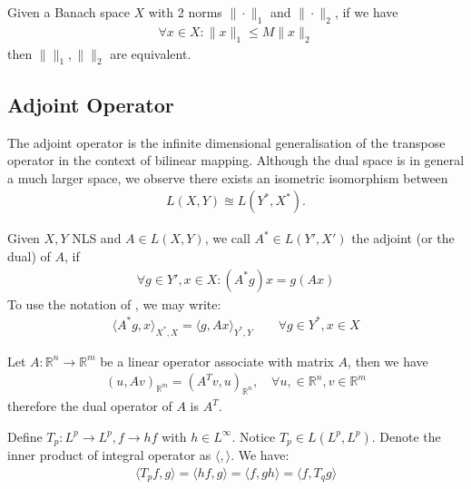 \begin{corollary}
	Given a Banach space $X$ with 2 norms $\|\cdot\|_1$ and $\|\cdot\|_2$, if we have
	\begin{align*}
		\forall x \in X: \|x\|_1 \le M \|x\|_2
	\end{align*}
	then $\|\|_1, \|\|_2$ are equivalent.
\end{corollary}




 

\subsection{Adjoint Operator}
The adjoint operator is the infinite dimensional generalisation of the transpose operator in the context of bilinear mapping. Although the dual space is in general a much larger space, we observe there exists an isometric isomorphism between 
\begin{align*}
	L(X, Y) \approxeq L(Y^*, X^*). 
\end{align*}
\begin{definition}
	Given $X, Y$ NLS and $A \in L(X,Y)$, we call $A^* \in L(Y', X') $ the adjoint (or the dual) of $A$, if
	\begin{align*}
		\forall g \in Y', x \in X: (A^*g)x = g(Ax)
	\end{align*}
	To use the notation of , we may write:
	\begin{align*}
		\langle A^*g, x\rangle_{X^*,X} = \langle g, Ax\rangle_{Y^*, Y} \qquad \forall g \in Y^*, x \in X
	\end{align*}
\end{definition}

\begin{example}
Let $A: \mathbb{R}^n \rightarrow \mathbb{R}^m$ be a linear operator associate with matrix $A$, then we have
\begin{align*}
	(u, Av)_{\mathbb{R}^m} = (A^Tv, u)_{\mathbb{R}^n},\quad \forall u, \in \mathbb{R}^n, v \in \mathbb{R}^m
\end{align*}	
therefore the dual operator of $A$ is $A^T$. 
\end{example}


\begin{example}
	Define $T_p: L^p \rightarrow L^p, f \rightarrow hf$ with $h \in L^\infty$. Notice $T_p \in L(L^p, L^p)$. Denote the inner product of integral operator as $\langle, \rangle$. We have:
	\begin{align*}
		\langle T_pf, g\rangle = \langle hf, g\rangle = \langle f, gh\rangle = \langle f, T_qg\rangle
	\end{align*}
\end{example}



